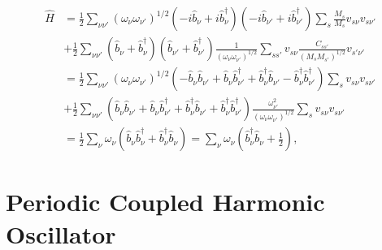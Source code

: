 \documentclass{article}
\begin{document}
\begin{align}
    \hat{H} &= \frac{1}{2} \sum_{\nu \nu'}
        (\omega_\nu \omega_{\nu'})^{1/2} 
        (-i \hat{b}_\nu + i \hat{b}_\nu^\dagger)(-i \hat{b}_{\nu'} + i \hat{b}_{\nu'}^\dagger)
         \sum_{s}\frac{M_s }{M_s} v_{s \nu} v_{s \nu'}
         \nonumber \\
         &+\frac{1}{2} \sum_{\nu \nu'}
         (\hat{b}_\nu + \hat{b}_\nu^\dagger)(\hat{b}_{\nu'} + \hat{b}_{\nu'}^\dagger)
         \frac{1}{(\omega_\nu \omega_{\nu'})^{1/2}}
         \sum_{s s'} v_{s \nu} \frac{C_{s s'}}{(M_s M_{s'})^{1/2}} v_{s' \nu'} 
         \nonumber \\
         &= \frac{1}{2} \sum_{\nu \nu'}
         (\omega_\nu \omega_{\nu'})^{1/2} 
         (-\hat{b}_\nu\hat{b}_{\nu'} + \hat{b}_\nu\hat{b}_{\nu'}^\dagger + \hat{b}_\nu^\dagger\hat{b}_{\nu'} - \hat{b}_\nu^\dagger\hat{b}_{\nu'}^\dagger)
          \sum_{s} v_{s \nu} v_{s \nu'}
          \nonumber \\
          &+\frac{1}{2} \sum_{\nu \nu'}
          (\hat{b}_\nu\hat{b}_{\nu'} + \hat{b}_\nu\hat{b}_{\nu'}^\dagger + \hat{b}_\nu^\dagger\hat{b}_{\nu'} + \hat{b}_\nu^\dagger\hat{b}_{\nu'}^\dagger)
          \frac{\omega_{\nu'}^2}{(\omega_\nu \omega_{\nu'})^{1/2}}
          \sum_{s } v_{s \nu} v_{s \nu'} 
          \nonumber \\
          &=\frac{1}{2} \sum_{\nu} \omega_\nu (\hat{b}_\nu\hat{b}_\nu^\dagger + \hat{b}_\nu^\dagger\hat{b}_\nu)
          =\sum_{\nu} \omega_\nu \left(\hat{b}_\nu^\dagger\hat{b}_\nu + \frac{1}{2}\right)
         ,
\end{align}

\section{Periodic Coupled Harmonic Oscillator}
\end{document}
